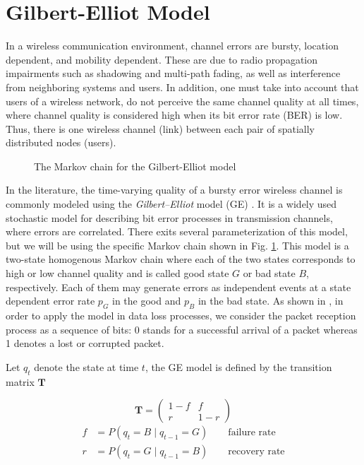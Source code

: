 \section{Gilbert-Elliot Model} \label{sec:GE}

In a wireless communication environment, channel errors are bursty, location
dependent, and mobility dependent. These are due to radio propagation
impairments such as shadowing and multi-path fading, as well as interference
from neighboring systems and users. In addition, one must take into account that
users of a wireless network, do not perceive the same channel quality at all
times, where channel quality is considered high when its bit error rate (BER) is
low. Thus, there is one wireless channel (link) between each pair of spatially
distributed nodes (users). 

\begin{figure}[h]
  \centering
   
  \caption{The Markov chain for the Gilbert-Elliot model}
  \label{fig:GE_FSM}
\end{figure}

In the literature, the time-varying quality of a bursty error wireless channel
is commonly modeled using the \textit{Gilbert–Elliot} model (GE)
\cite{gilbert1960capacity, elliott1963estimates}. It is a widely used stochastic
model for describing bit error processes in transmission channels, where errors
are correlated. There exits several parameterization of this model, but we will
be using the specific Markov chain shown in Fig. \ref{fig:GE_FSM}. This model is
a two-state homogenous Markov chain where each of the two states corresponds to
high or low channel quality and is called good state $G$ or bad state $B$,
respectively. Each of them may generate errors as independent events at a state
dependent error rate $p_G$ in the good and $p_B$ in the bad state. As shown in
\cite{hasslinger2008gilbert}, in order to apply the model in data loss
processes, we consider the packet reception process as a sequence of bits: 0
stands for a successful arrival of a packet whereas 1 denotes a lost or
corrupted packet.

Let $q_t$ denote the state at time $t$, the GE model is defined by the
transition matrix $\mathbf{T}$

\begin{equation*}
  \mathbf{T} = \left (\begin{array}{cc} 1-f & f \\ r & 1-r \end{array} \right) 
\end{equation*}
\begin{align*}
  f &= P(q_t = B \mid q_{t-1} = G) \qquad \textrm{failure rate} \\
  r &= P(q_t = G \mid q_{t-1} = B) \qquad \textrm{recovery rate}
\end{align*}

